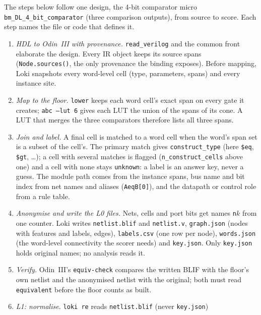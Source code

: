 \documentclass[conference]{IEEEtran}
\newcommand{\code}[1]{\texttt{#1}}
\begin{document}
The steps below follow one design, the 4-bit comparator micro \code{bm\_DL\_4\_bit\_comparator}
(three comparison outputs), from source to score. Each step names the file or code that
defines it.

\begin{enumerate}
\item \emph{HDL to Odin~III with provenance.} \code{read\_verilog} and the common front
 elaborate the design. Every IR object keeps its source spans (\code{Node.sources()}, the
 only provenance the binding exposes). Before mapping, Loki snapshots every word-level cell
 (type, parameters, spans) and every instance site.
\item \emph{Map to the floor.} \code{lower} keeps each word cell's exact span on every gate
 it creates; \code{abc --lut 6} gives each LUT the union of the spans of its cone. A LUT
 that merges the three comparators therefore lists all three spans.
\item \emph{Join and label.} A final cell is matched to a word cell when the word's span set
 is a subset of the cell's. The primary match gives \code{construct\_type} (here \code{\$eq},
 \code{\$gt}, \dots); a cell with several matches is flagged (\code{n\_construct\_cells}
 above one) and a cell with none stays \code{unknown}: a label is an answer key, never a
 guess. The module path comes from the instance spans, bus name and bit index from net
 names and aliases (\code{AeqB[0]}), and the datapath or control role from a rule table.
\item \emph{Anonymise and write the L0 files.} Nets, cells and port bits get names
 \code{n}$k$ from one counter. Loki writes \code{netlist.blif} and \code{netlist.v},
 \code{graph.json} (nodes with features and labels, edges), \code{labels.csv} (one row per
 node), \code{words.json} (the word-level connectivity the scorer needs) and \code{key.json}.
 Only \code{key.json} holds original names; no analysis reads it.
\item \emph{Verify.} Odin~III's \code{equiv-check} compares the written BLIF with the
 floor's own netlist and the anonymised netlist with the original; both must read
 \code{equivalent} before the floor counts as built.
\item \emph{L1: normalise.} \code{loki re} reads \code{netlist.blif} (never \code{key.json})

\end{enumerate}
\end{document}
